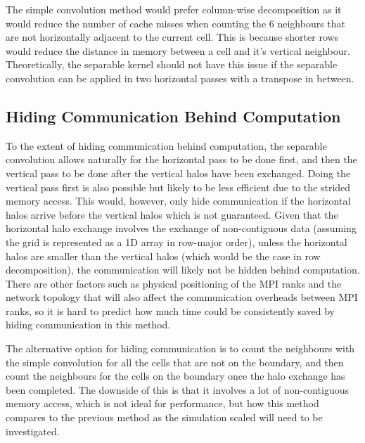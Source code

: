     The simple convolution method would prefer column-wise decomposition as it would reduce the number of cache misses
    when counting the 6 neighbours that are not horizontally adjacent to the current cell.
    This is because shorter rows would reduce the distance in memory between a cell and it's vertical neighbour.
    Theoretically, the separable kernel should not have this issue if the separable convolution can be applied in two horizontal
    passes with a transpose in between.

    \subsection{Hiding Communication Behind Computation}\label{subsec:hiding-comms}
    To the extent of hiding communication behind computation, the separable convolution allows naturally for the horizontal
    pass to be done first, and then the vertical pass to be done after the vertical halos have been exchanged.
    Doing the vertical pass first is also possible but likely to be less efficient due to the strided memory access.
    This would, however, only hide communication if the horizontal halos arrive before the vertical halos which is not guaranteed.
    Given that the horizontal halo exchange involves the exchange of non-contiguous data (assuming the grid is represented
    as a 1D array in row-major order), unless the horizontal halos are smaller than the vertical halos (which would be
    the case in row decomposition), the communication will likely not be hidden behind computation.
    There are other factors such as physical positioning of the MPI ranks and the network topology that will also affect
    the communication overheads between MPI ranks, so it is hard to predict how much time could be consistently saved by
    hiding communication in this method.

    The alternative option for hiding communication is to count the neighbours with the simple convolution
    for all the cells that are not on the boundary, and then count the neighbours for the cells on the boundary once the halo
    exchange has been completed.
    The downside of this is that it involves a lot of non-contiguous memory access, which is not ideal for performance, but
    how this method compares to the previous method as the simulation scaled will need to be investigated.

